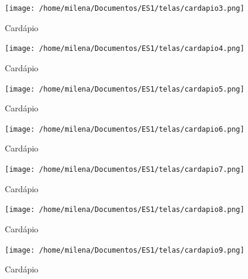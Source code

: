 \documentclass[12pt, a4paper]{article}
\begin{document}
\begin{figure}[htb]
	\caption{Cardápio}
	
	\centering %
	\texttt{[image: /home/milena/Documentos/ES1/telas/cardapio3.png]} %
\end{figure}

\begin{figure}[htb]
	\caption{Cardápio}
	
	\centering %
	\texttt{[image: /home/milena/Documentos/ES1/telas/cardapio4.png]} %
	
\end{figure}

\begin{figure}[htb]
	\caption{Cardápio}
	
	\centering %
	\texttt{[image: /home/milena/Documentos/ES1/telas/cardapio5.png]} %
	
\end{figure}

\begin{figure}[htb]
	\caption{Cardápio}
	
	\centering %
	\texttt{[image: /home/milena/Documentos/ES1/telas/cardapio6.png]} %
	
\end{figure}

\begin{figure}[htb]
	\caption{Cardápio}
	
	\centering %
	\texttt{[image: /home/milena/Documentos/ES1/telas/cardapio7.png]} %
	
\end{figure}

\begin{figure}[htb]
	\caption{Cardápio}
	
	\centering %
	\texttt{[image: /home/milena/Documentos/ES1/telas/cardapio8.png]} %
	
\end{figure}

\begin{figure}[htb]
	\caption{Cardápio}
	
	\centering %
	\texttt{[image: /home/milena/Documentos/ES1/telas/cardapio9.png]} %
	
\end{figure}
\end{document}
